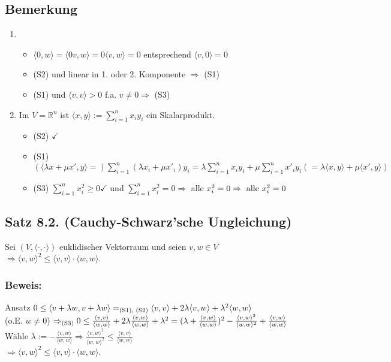 \documentclass[a4paper, 12pt]{extarticle}
\newcommand{\skalar}[2] {
	\langle #1, #2\rangle
}
\newcommand{\genskalar}{
	\skalar{\cdot }{\cdot }
}
\newcommand{\tn}[1]{\textnormal {#1}}
\begin{document}
\subsection*{Bemerkung}
\begin{enumerate} [label=\arabic*)]
	\item \begin{itemize}
		\item ${\skalar{0}{w}} = {\skalar{0v}{w}} = 0{\skalar{v}{w}} = 0$ entsprechend ${\skalar{v}{0}} = 0$
		\item (S2) und linear in 1. oder 2. Komponente $\Rightarrow$ (S1)
		\item (S1) und ${\skalar{v}{v}} > 0$ f.a. $v \neq 0 \Rightarrow$ (S3)
	\end{itemize}
	\item Im $V = \mathbb{R}^n$ ist ${\skalar{x}{y}} := \sum_{i=1}^{n}x_iy_i$ ein Skalarprodukt.\\
	\begin{itemize}
		\item (S2) $\checkmark$
		\item (S1) $({\skalar{\lambda x+\mu x'}{y}} =)\sum_{i=1}^{n}(\lambda x_i+\mu x'_i)y_i = \lambda\sum_{i=1}^{n}x_iy_i+\mu\sum_{i=1}^{n}x'_iy_i (= \lambda{\skalar{x}{y}}+\mu{\skalar{x'}{y}})$
		\item (S3) $\sum_{i=1}^{n}x_i^2 \geq 0 \checkmark$ und $\sum_{i=1}^{n}x_i^2 = 0 \Rightarrow$ alle $x_i^2 = 0 \Rightarrow \tn{ alle } x_i^2 = 0$
	\end{itemize}
\end{enumerate}

\subsection*{Satz 8.2. (Cauchy-Schwarz'sche Ungleichung)}
Sei $(V, \genskalar)$ euklidischer Vektorraum und seien $v, w \in V$\\
$\Rightarrow {\skalar{v}{w}}^2 \leq {\skalar{v}{v}} \cdot {\skalar{w}{w}}$.

\subsubsection*{Beweis:}
Ansatz $0 \leq {\skalar{v+\lambda w}{v+\lambda w}} =_{\tn{(S1), (S2)}} {\skalar{v}{v}}+2\lambda {\skalar{v}{w}}+\lambda^2{\skalar{w}{w}}$\\
(o.E. $w \neq 0$) $\Rightarrow_{\tn{(S3)}} 0 \leq \frac{\skalar{v}{v}}{\skalar{w}{w}}+2\lambda \frac{\skalar{v}{w}}{\skalar{w}{w}}+\lambda^2 = (\lambda + \frac{\skalar{v}{w}}{\skalar{w}{w}})^2-\frac{\skalar{v}{w}^2}{\skalar{w}{w}^2}+\frac{\skalar{v}{w}}{\skalar{w}{w}}$\\
Wähle $\lambda := -\frac{\skalar{v}{w}}{\skalar{w}{w}} \Rightarrow \frac{\skalar{v}{w}^2}{\skalar{w}{w}^2} \leq \frac{\skalar{v}{v}}{\skalar{w}{w}}$\\
$\Rightarrow {\skalar{v}{w}}^2 \leq {\skalar{v}{v}} \cdot {\skalar{w}{w}}$.
\end{document}
